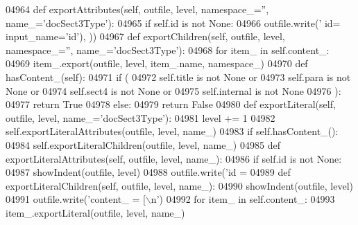 \begin{DoxyCode}
{{{{{{{{{{{{{{{{{{{{{{{{{{{{{{{{{{{{{{{{{{{{{{{{{{{{{{{{{{{{{{{{{{{{{{{{{{{{{{{{{{{{{{{{{{{{{{{{{{{{{{{{{{{{{{{{{{{{{{{{{{{{{{{{{{{{{{{{{{{{{{{{{{{{{{{{{{{{{{{{{{{{{{{{{{{{{{{{{{{{{{{{{{{{{{{{{{{{{{{{{{{{{{{{{{{{{{{{{{{{{{{{{{{{{{{{{{{{{{{{{{{{{{{{{{{{{{{{{{{{{{{{{{{{{{{{{{{{{{{{{{{{{{{{{{{{{{{{{{{{{{{{{{{{{{{{{{{{{{{{{{{{{{{{{{04964     \textcolor{keyword}{def }exportAttributes(self, outfile, level, namespace\_='', name\_='docSect3Type'):
04965         \textcolor{keywordflow}{if} self.id \textcolor{keywordflow}{is} \textcolor{keywordflow}{not} \textcolor{keywordtype}{None}:
04966             outfile.write(\textcolor{stringliteral}{' id=%
      input\_name=\textcolor{stringliteral}{'id'}), ))
04967     \textcolor{keyword}{def }exportChildren(self, outfile, level, namespace\_='', name\_='docSect3Type'):
04968         \textcolor{keywordflow}{for} item\_ \textcolor{keywordflow}{in} self.content_:
04969             item\_.export(outfile, level, item\_.name, namespace\_)
04970     \textcolor{keyword}{def }hasContent_(self):
04971         \textcolor{keywordflow}{if} (
04972             self.title \textcolor{keywordflow}{is} \textcolor{keywordflow}{not} \textcolor{keywordtype}{None} \textcolor{keywordflow}{or}
04973             self.para \textcolor{keywordflow}{is} \textcolor{keywordflow}{not} \textcolor{keywordtype}{None} \textcolor{keywordflow}{or}
04974             self.sect4 \textcolor{keywordflow}{is} \textcolor{keywordflow}{not} \textcolor{keywordtype}{None} \textcolor{keywordflow}{or}
04975             self.internal \textcolor{keywordflow}{is} \textcolor{keywordflow}{not} \textcolor{keywordtype}{None}
04976             ):
04977             \textcolor{keywordflow}{return} \textcolor{keyword}{True}
04978         \textcolor{keywordflow}{else}:
04979             \textcolor{keywordflow}{return} \textcolor{keyword}{False}
04980     \textcolor{keyword}{def }exportLiteral(self, outfile, level, name\_='docSect3Type'):
04981         level += 1
04982         self.exportLiteralAttributes(outfile, level, name\_)
04983         \textcolor{keywordflow}{if} self.hasContent_():
04984             self.exportLiteralChildren(outfile, level, name\_)
04985     \textcolor{keyword}{def }exportLiteralAttributes(self, outfile, level, name\_):
04986         \textcolor{keywordflow}{if} self.id \textcolor{keywordflow}{is} \textcolor{keywordflow}{not} \textcolor{keywordtype}{None}:
04987             showIndent(outfile, level)
04988             outfile.write(\textcolor{stringliteral}{'id = %
04989     \textcolor{keyword}{def }exportLiteralChildren(self, outfile, level, name\_):
04990         showIndent(outfile, level)
04991         outfile.write(\textcolor{stringliteral}{'content\_ = [\(\backslash\)n'})
04992         \textcolor{keywordflow}{for} item\_ \textcolor{keywordflow}{in} self.content_:
04993             item\_.exportLiteral(outfile, level, name\_)
}}}}}}}}}}}}}}}}}}}}}}}}}}}}}}}}}}}}}}}}}}}}}}}}}}}}}}}}}}}}}}}}}}}}}}}}}}}}}}}}}}}}}}}}}}}}}}}}}}}}}}}}}}}}}}}}}}}}}}}}}}}}}}}}}}}}}}}}}}}}}}}}}}}}}}}}}}}}}}}}}}}}}}}}}}}}}}}}}}}}}}}}}}}}}}}}}}}}}}}}}}}}}}}}}}}}}}}}}}}}}}}}}}}}}}}}}}}}}}}}}}}}}}}}}}}}}}}}}}}}}}}}}}}}}}}}}}}}}}}}}}}}}}}}}}}}}}}}}}}}}}}}}}}}}}}}}}}}}}}}}}}}}}}}}}}}
\end{DoxyCode}
